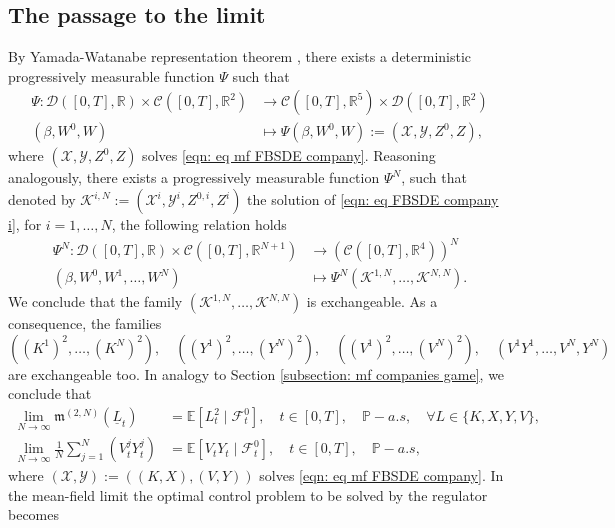 \documentclass[10pt,a4paper]{amsart}
\numberwithin{equation}{section}
\newcommand{\E}{\mathbb{E}}
\newcommand{\R}{\mathbb{R}}
\newcommand{\ItF}{\mathcal{F}}
\newcommand{\prob}{\mathbb{P}}
\newcommand{\avg}{\frac{1}{N}\sum_{j = 1}^N}
\begin{document}
\subsection{The passage to the limit}\label{subsect_MFG_passage_to_limit}
By Yamada-Watanabe representation theorem \cite[Theorem 1.33]{carmona2018probabilistic2}, there exists a deterministic progressively measurable function $\Psi$ such that
\begin{align*}
\Psi:\mathcal{D}([0,T],\R) \times \mathcal{C}([0,T],\R^2)&\to \mathcal{C}([0,T], \R^5)\times  \mathcal{D}([0,T],\R^2) \\
(\beta, W^0, W) & \mapsto\Psi( \beta, W^0,W):= (\mathcal{X}, \mathcal{Y}, Z^0,Z),
\end{align*} 
where $(\mathcal{X},\mathcal{Y},Z^0,Z)$ solves \eqref{eqn: eq mf FBSDE company}. Reasoning analogously, there exists a progressively measurable function $\Psi^N$, such that denoted by $\mathcal{K}^{i,N}:= (\mathcal{X}^i, \mathcal{Y}^i, Z^{0,i}, Z^i)$ the solution of \eqref{eqn: eq FBSDE company i}, for $i = 1,\dots,N$, the following relation holds
\begin{align*} 
\Psi^N: \mathcal{D}([0,T],\R) \times \mathcal{C}([0,T],\R^{N+1})&\to (\mathcal{C}([0,T],\R^4))^N\\ 
 ( \beta, W^0,W^1,\dots,W^N)& \mapsto \Psi^N(\mathcal{K}^{1,N},\dots, \mathcal{K}^{N,N}).
\end{align*}
We conclude that the family $(\mathcal{K}^{1,N},\dots, \mathcal{K}^{N,N})$ is exchangeable. As a consequence, the families 
\begin{equation*}
((K^1)^2,\dots, (K^N)^2),\quad ((Y^1)^2,\dots, (Y^N)^2),\quad ((V^1)^2,\dots, (V^N)^2),\quad(V^1Y^1,\dots, V^N,Y^N)
\end{equation*}
are exchangeable too. In analogy to Section \ref{subsection: mf companies game}, we conclude that
\begin{align*} 
\lim_{N\to \infty} \mathfrak{m}^{(2,N)}(\underline{L}_t) &= \E[L_t^2 \mid \ItF^0_t],\quad t\in[0,T],\quad \prob-a.s,\quad \forall L\in \{K,X,Y,V\},\\
\lim_{N\to \infty} \avg (V^j_tY^j_t)  &= \E[V_tY_t \mid \ItF^0_t],\quad t\in[0,T],\quad \prob-a.s,
\end{align*}
where $(\mathcal{X}, \mathcal{Y}) := ((K,X), (V,Y))$ solves \eqref{eqn: eq mf FBSDE company}. In the mean-field limit the optimal control problem to be solved by the regulator becomes
\end{document}

